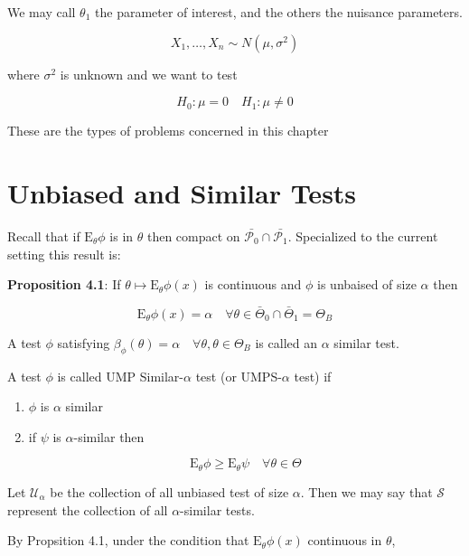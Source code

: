 \documentclass[11pt,fleqn]{book} %
\newcommand{\E}{\mathrm{E}}
\begin{document}
We may call $\theta_1$ the parameter of interest, and the others the nuisance parameters. 

\begin{example}
	$$X_1, \dots, X_n \sim N(\mu, \sigma^2) $$

where $\sigma^2$ is unknown and we want to test
	
		$$H_0: \mu = 0 \quad H_1: \mu \neq 0 $$


\end{example}

These are the types of problems concerned in this chapter


\section{Unbiased and Similar Tests}

Recall that if $\E_\theta \phi$ is in $\theta$ then compact on $\bar{\mathscr{P}_0} \cap \bar{\mathscr{P}_1}$. Specialized to the current setting this result is: 

\textbf{Proposition 4.1}: If $\theta \mapsto \E_\theta \phi(x)$ is continuous and $\phi$ is unbaised of size $\alpha$ then 

		$$\E_\theta \phi(x) = \alpha \quad \forall \theta \in \bar{\mathscr{\Theta}}_0 \cap \bar{\mathscr{\Theta}}_1 = \Theta_B $$


\begin{definition}
	A test $\phi$ satisfying $\beta_\phi(\theta) = \alpha \quad \forall \theta, \theta \in \Theta_B$ is called an $\alpha$ similar test. 

	A test $\phi$ is called UMP Similar-$\alpha$ test (or UMPS-$\alpha$ test) if

			\begin{enumerate}
			 	\item $\phi$  is $\alpha$ similar
			 	\item if $\psi$ is $\alpha$-similar then 

			 			$$\E_\theta \phi \geq \E_\theta \psi \quad \forall \theta \in \Theta $$ 
			 \end{enumerate} 

	Let $\mathscr{U}_\alpha$ be the collection of all unbiased test of size $\alpha$. Then we may say that $\mathscr{S}$ represent the collection of all $\alpha$-similar tests. 
\end{definition}


By Propsition 4.1, under the condition that $\E_\theta \phi(x)$ continuous in $\theta$, 
\end{document}
